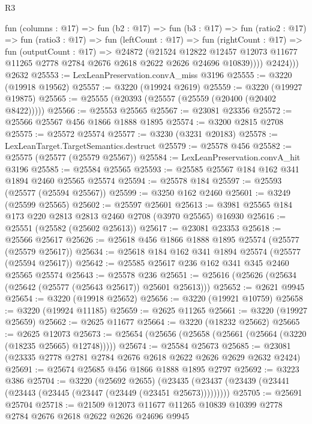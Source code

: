 \begin{lexlean}{R3}
\begin{coremodule}
            fun (columns : @17) =>
            fun (b2 : @17) =>
            fun (b3 : @17) =>
            fun (ratio2 : @17) =>
            fun (ratio3 : @17) =>
            fun (leftCount : @17) =>
            fun (rightCount : @17) =>
            fun (outputCount : @17) =>
            @24872
              (@21524
                @12822
                @12457
                @12073
                @11677
                @11265
                @2778
                @2784
                @2676
                @2618
                @2622
                @2626
                @24696
                @10839))))
          @2424)))
    @2632
@25553 := LexLeanPreservation.convA_miss @3196
@25555 := @3220 (@19918 @19562)
@25557 := @3220 (@19924 @2619)
@25559 := @3220 (@19927 @19875)
@25565 := @25555 (@20393 (@25557 (@25559 (@20400 (@20402 @8422)))))
@25566 := @25553 @25565
@25567 := @23081 @23356
@25572 := @25566 @25567 @456 @1866 @1888 @1895
@25574 := @3200 @2815 @2708
@25575 := @25572 @25574
@25577 := @3230 (@3231 @20183)
@25578 := LexLeanTarget.TargetSemantics.destruct
@25579 := @25578 @456
@25582 := @25575 (@25577 (@25579 @25567))
@25584 := LexLeanPreservation.convA_hit @3196
@25585 := @25584 @25565
@25593 := @25585 @25567 @184 @162 @341 @1894 @2460 @25565 @25574
@25594 := @25578 @184
@25597 := @25593 (@25577 (@25594 @25567))
@25599 := @3250 @162 @2460
@25601 := @3249 (@25599 @25565)
@25602 := @25597 @25601
@25613 := @3981 @25565 @184 @173 @220 @2813 @2813 @2460 @2708 (@3970 @25565) @16930
@25616 := @25551 (@25582 (@25602 @25613))
@25617 := @23081 @23353
@25618 := @25566 @25617
@25626 := @25618 @456 @1866 @1888 @1895 @25574 (@25577 (@25579 @25617))
@25634 := @25618 @184 @162 @341 @1894 @25574 (@25577 (@25594 @25617))
@25642 := @25585 @25617 @236 @162 @341 @345 @2460 @25565 @25574
@25643 := @25578 @236
@25651 := @25616 (@25626 (@25634 (@25642 (@25577 (@25643 @25617)) @25601 @25613)))
@25652 := @2621 @9945
@25654 := @3220 (@19918 @25652)
@25656 := @3220 (@19921 @10759)
@25658 := @3220 (@19924 @11185)
@25659 := @2625 @11265
@25661 := @3220 (@19927 @25659)
@25662 := @2625 @11677
@25664 := @3220 (@18232 @25662)
@25665 := @2625 @12073
@25673 := @25654 (@25656 (@25658 (@25661 (@25664 (@3220 (@18235 @25665) @12748)))))
@25674 := @25584 @25673
@25685 := @23081 (@23335 @2778 @2781 @2784 @2676 @2618 @2622 @2626 @2629 @2632 @2424)
@25691 := @25674 @25685 @456 @1866 @1888 @1895 @2797
@25692 := @3223 @386
@25704 := @3220
    (@25692 @2655)
    (@23435 (@23437 (@23439 (@23441 (@23443 (@23445 (@23447 (@23449 (@23451 @25673)))))))))
@25705 := @25691 @25704
@25718 := @21509 @12073 @11677 @11265 @10839 @10399 @2778 @2784 @2676 @2618 @2622 @2626 @24696 @9945

\end{coremodule}
\end{lexlean}
